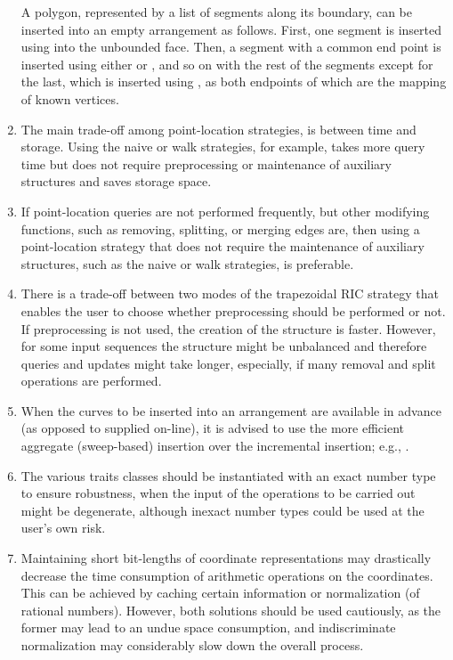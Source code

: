 \begin{enumerate}
A polygon, represented by a list of segments along its boundary, can
be inserted into an empty arrangement as follows. First, one segment
is inserted using  into the unbounded
face. Then, a segment with a common end point is inserted using either
 or ,
and so on with the rest of the segments except for the last, which is
inserted using , as both endpoints of which
are the mapping of known vertices.

\item
The main trade-off among point-location strategies, is between time
and storage. Using the naive or walk strategies, for example, takes
more query time but does not require preprocessing or maintenance of
auxiliary structures and saves storage space.

\item
If point-location queries are not performed frequently, but other
modifying functions, such as removing, splitting, or merging edges
are, then using a point-location strategy that does not require the
maintenance of auxiliary structures, such as the naive or walk
strategies, is preferable.

\item
There is a trade-off between two modes of the trapezoidal RIC strategy
that enables the user to choose whether preprocessing should be
performed or not. If preprocessing is not used, the creation of the
structure is faster. However, for some input sequences the structure
might be unbalanced and therefore queries and updates might take
longer, especially, if many removal and split operations are
performed.

\item
When the curves to be inserted into an arrangement are available in
advance (as opposed to supplied on-line), it is advised to use the
more efficient aggregate (sweep-based) insertion over the incremental
insertion; e.g., .


\item
The various traits classes should be instantiated with an exact number
type to ensure robustness, when the input of the operations to be
carried out might be degenerate, although inexact number types could
be used at the user's own risk.

\item
Maintaining short bit-lengths of coordinate representations may
drastically decrease the time consumption of arithmetic operations on
the coordinates. This can be achieved by caching certain information
or normalization (of rational numbers). However, both solutions should
be used cautiously, as the former may lead to an undue space
consumption, and indiscriminate normalization may considerably slow
down the overall process.


\end{enumerate}
